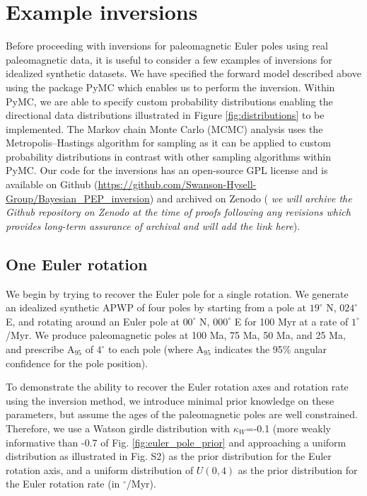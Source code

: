 \documentclass[]{agujournal2019}
\begin{document}
\section{Example inversions}
\label{sec:example_inversion}

Before proceeding with inversions for paleomagnetic Euler poles using real paleomagnetic data, it is useful to consider a few examples of inversions for idealized synthetic datasets. We have specified the forward model described above using the package PyMC \cite{Salvatier2016a} which enables us to perform the inversion. Within PyMC, we are able to specify custom probability distributions enabling the directional data distributions illustrated in Figure \ref{fig:distributions} to be implemented. The Markov chain Monte Carlo (MCMC) analysis uses the Metropolis–Hastings algorithm for sampling as it can be applied to custom probability distributions in contrast with other sampling algorithms within PyMC. Our code for the inversions has an open-source GPL license and is available on Github (\url{https://github.com/Swanson-Hysell-Group/Bayesian_PEP_inversion}) and archived on Zenodo ( \textit{we will archive the Github repository on Zenodo at the time of proofs following any revisions which provides long-term assurance of archival and will add the link here}).

\subsection{One Euler rotation}
\label{sec:one_stage_pole}
We begin by trying to recover the Euler pole for a single rotation. We generate an idealized synthetic APWP of four poles by starting from a pole at $19^\circ$ N, $024^\circ$ E, and rotating around an Euler pole at $00^\circ$ N, $000^\circ$ E for 100 Myr at a rate of $1^\circ$/Myr. We produce paleomagnetic poles at 100 Ma, 75 Ma, 50 Ma, and 25 Ma, and prescribe A$_{95}$ of $4^\circ$ to each pole (where A$_{95}$ indicates the 95\% angular confidence for the pole position).

To demonstrate the ability to recover the Euler rotation axes and rotation rate using the inversion method, we introduce minimal prior knowledge on these parameters, but assume the ages of the paleomagnetic poles are well constrained. Therefore, we use a Watson girdle distribution with $\kappa_W$=-0.1 (more weakly informative than -0.7 of Fig. \ref{fig:euler_pole_prior} and approaching a uniform distribution as illustrated in Fig. S2) as the prior distribution for the Euler rotation axis, and a uniform distribution of $U(0, 4)$ as the prior distribution for the Euler rotation rate (in $^\circ$/Myr). 
\end{document}
